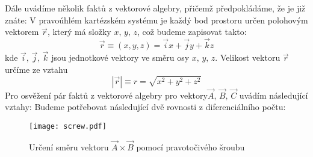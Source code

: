    Dále uvádíme několik faktů z vektorové algebry, přičemž předpokládáme, že je již znáte: V 
    pravoúhlém kartézském systému je každý bod prostoru určen polohovým vektorem $\vec{r}$, který má 
    složky $x,\,y,\,z$, což budeme zapisovat takto:
    \begin{equation}\label{temp:eq_vektor_r_zapis}
      \vec{r}\equiv(x,y,z)=\vec{i}x+\vec{j}y+\vec{k}z
    \end{equation}
    kde $\vec{i},\,\vec{j},\,\vec{k}$ jsou jednotkové vektory ve směru osy $x,\,y,\,z$. Velikost 
    vektoru $\vec{r}$ určíme ze vztahu
    \begin{equation}\label{temp:eq_velikost_vektoru_r}
      |\vec{r}|\equiv r = \sqrt{x^2+y^2+z^2}
    \end{equation}
    Pro osvěžení pár faktů z vektorové algebry pro vektory$\vec{A},\,\vec{B},\,\vec{C}$ uvádím 
    následující vztahy: Budeme potřebovat následující dvě rovnosti z dife\-ren\-ci\-ál\-ní\-ho počtu:

    \begin{figure}
      \centering
      \texttt{[image: screw.pdf]}
      \caption{Určení směru vektoru $\vec{A}\times\vec{B}$ pomocí pravotočivého šroubu}
      \label{fyz:fig_sroub_axb} 
    \end{figure}

